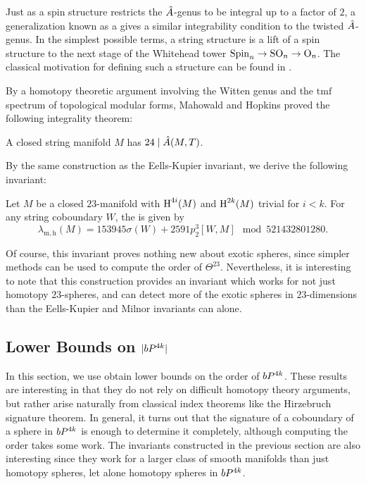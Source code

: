 Just as a spin structure restricts the ${\hat{A}}$-genus to be integral up to a factor of $2$, a generalization known as a  gives a similar integrability condition to the twisted ${\hat{A}}$-genus. In the simplest possible terms, a string structure is a lift of a spin structure to the next stage of the Whitehead tower $\mathrm{Spin}_n \to \mathrm{SO}_n \to \mathrm{O}_n$. The classical motivation for defining such a structure can be found in \cite{witten1988string}.

By a homotopy theoretic argument involving the Witten genus and the $\mathrm{tmf}$ spectrum of topological modular forms, Mahowald and Hopkins proved the following integrality theorem:
\begin{theorem}
	A closed string manifold $M$ has $24\mid {\hat{A}}(M,T)$.
\end{theorem}

By the same construction as the Eells-Kupier invariant, we derive the following invariant:

\begin{corollary}
	Let $M$ be a closed $23$-manifold with $\operatorname{H}^{4i}(M)$ and $\operatorname{H}^{2k}(M)$ trivial for $i<k$. For any string coboundary $W$, the  is given by
	\[
		\lambda_{\mathrm{m,h}}(M) = 153945\sigma(W) + 2591p_2^3[W,M]\mod 521432801280.
	\]
\end{corollary}

Of course, this invariant proves nothing new about exotic spheres, since simpler methods can be used to compute the order of $\Theta^{23}$. Nevertheless, it is interesting to note that this construction provides an invariant which works for not just homotopy $23$-spheres, and can detect more of the exotic spheres in $23$-dimensions than the Eells-Kupier and Milnor invariants can alone.

\subsection{Lower Bounds on \texorpdfstring{$|bP^{4k}|$}{|bP^4k|}}\label{sec:lower-bounds}

In this section, we use obtain lower bounds on the order of $bP^{4k}$. These results are interesting in that they do not rely on difficult homotopy theory arguments, but rather arise naturally from classical index theorems like the Hirzebruch signature theorem. In general, it turns out that the signature of a coboundary of a sphere in $bP^{4k}$ is enough to determine it completely, although computing the order takes some work. The invariants constructed in the previous section are also interesting since they work for a larger class of smooth manifolds than just homotopy spheres, let alone homotopy spheres in $bP^{4k}$.

